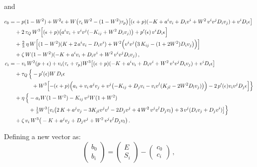 \documentclass[prd,aps,twocolumn,floats,floatfix,nofootinbib,superscriptaddress] {revtex4-1}
\begin{document}
and 
\begin{widetext}
\begin{align}
c_{0} = &-p (1 - W^2) + W^2 \epsilon +W\big(\tau_{\epsilon}\,W^2-(1-W^{2})\tau_{p}\big) \bigl[ (\epsilon + p) (-K+a^{i} v_{i} + D_{i}v^{i} + W^2\,v^{i} v^{j}  D_{i}v_{j}) + v^{i} D_{i}\epsilon\bigr] \nonumber\\
&+2\,\tau_{Q}\, W^3 \Bigl[ (\epsilon + p)\bigl( a^i v_i+ v^{i}v^{j}(- K_{ij} + W^2\, D_{i}v_{j})\bigr) + p'(\epsilon) \,v^{i}D_{i}\epsilon\Bigr]\nonumber\\
&+\tfrac{2}{3} \,\eta\,W \Bigl[(1 - W^2)(K+ 2 \,a^{i} v_{i} -  D_{i}v^{i}) + W^2 \Bigl( v^{i} v^{j} \bigl(3\, K_{ij} -  (1 + 2 W^2) D_{i}v_{j}\bigr)\Bigr)\Bigr] \nonumber\\
&+\zeta\, W (1 - W^2) (- K+ a^{i} v_{i} + D_{i}v^{i} + W^2\,v^{i} v^{j}  D_{i}v_{j})\,,\\
c_i=&- v_{i}\, W^2 (p + \epsilon) +v_{i} (\tau_\epsilon+\tau_p) W^3 \bigl[ (\epsilon + p) (-K+a^{i} v_{i} + D_{i}v^{i} + W^2\,v^{i} v^{j}  D_{i}v_{j}) + v^{i} D_{i}\epsilon\bigr]\nonumber\\
&+\tau_Q\,\Big\{
-  p'(\epsilon)W\, D_i\epsilon\nonumber\\
&\hspace{1.1cm}+W^3 \Bigl[- (\epsilon + p) \Bigl(a_i + v_{i}\,a^{j} v_{j} + v^{j} \bigl(- K_{ij} + D_{j}v_{i} -  v_{i} v^{l} (K_{jl} - 2 W^2 D_{l}v_{j})\bigr)\Bigr) - 2\, p'(\epsilon) v_{i} v^{j} D_{j}\epsilon\Bigr] 
\Big\}\nonumber\\
&+\eta\,\Big\{
-a_{i} W (1 - W^2) -  K_{ij} \,v^{j} W (1 + W^2) \nonumber\\
&\hspace{.9cm}+ \tfrac{1}{3} W^3 \big[ v_i \big(2\, K+ a^{j}  v_{j} - 3 K_{jl}  v^{j} v^{l}- 2  D_{j}v^{j} + 4\, W^2\, v^{j} v^{l}D_{j}v_{l}\big) + 3 \,v^{j}( D_{i}v_{j} +  D_{j}v^{i}) \big]
\Big\}\nonumber\\
&+\zeta\,v_{i}\, W^3 \big(- K + a^{j} v_{j} + D_{j}v^{j} + W^2\,v^{j} v^{l}  D_{j}v_{l}\big)\,.
\end{align}
\end{widetext}
Defining a new vector as:
\begin{equation}
\left(
\begin{array}{c}
b_0 \\
b_i
\end{array}
\right)    
     = \left(
\begin{array}{c}
E \\
S_i
\end{array}
\right)-
\left(
\begin{array}{c}
c_0 \\
c_i
\end{array}
\right)\,,
\end{equation}
\end{document}
